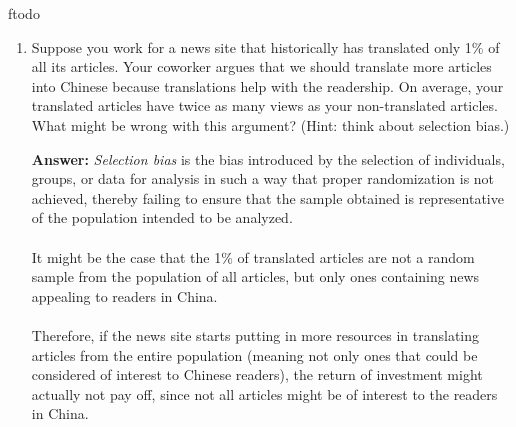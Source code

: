 ƒtodo\documentclass{article}
\newenvironment{QandA}{\begin{enumerate}[label=\arabic*.]}{\end{enumerate}}
\newenvironment{InnerQandA}{\begin{enumerate}[label=\roman*.]}{\end{enumerate}}
\newenvironment{answer}{\par\normalfont \textbf{Answer:}}{}
\begin{document}
\begin{QandA}
\begin{InnerQandA}
        \item Suppose you get back 100K labeled comments from 20 annotators and you want to look at some labels to estimate the quality of the labels. How many labels would you look at? How would you sample them?
        \begin{answer}
            Given that we have 20 annotators labeling 100K comments, in order to estimate the quality, we could look at 5\% of the comments (5000 out of the 100K), or roughly one annotator's workload. \\\\
            Since we are only interested in estimating the overall quality of the sample, we could perform \textit{simple random sampling}. On the other hand, if we were interested in the quality of work of each annotator, we could again perform stratified sampling, where each annotator's labeled pool of comments is considered a strata. From there, we can make a more informed decision about which annotators to retain in order to improve the overall quality of the work.
        \end{answer}
    \end{InnerQandA}    

    \item Suppose you work for a news site that historically has translated only 1\% of all its articles. Your coworker argues that we should translate more articles into Chinese because translations help with the readership. On average, your translated articles have twice as many views as your non-translated articles. What might be wrong with this argument? (Hint: think about selection bias.)
    \begin{answer}
        \textit{Selection bias} is the bias introduced by the selection of individuals, groups, or data for analysis in such a way that proper randomization is not achieved, thereby failing to ensure that the sample obtained is representative of the population intended to be analyzed. \\\\
        It might be the case that the 1\% of translated articles are not a random sample from the population of all articles, but only ones containing news appealing to readers in China. \\\\
        Therefore, if the news site starts putting in more resources in translating articles from the entire population (meaning not only ones that could be considered of interest to Chinese readers), the return of investment might actually not pay off, since not all articles might be of interest to the readers in China.
    \end{answer}


\end{QandA}
\end{document}
